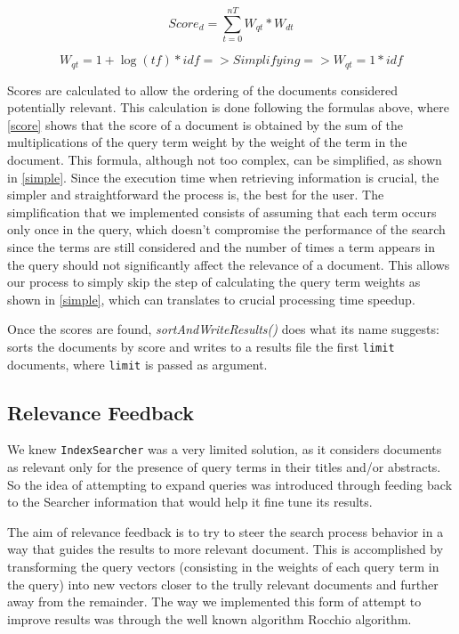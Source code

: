 \documentclass[12pt]{article}
\begin{document}
\begin{equation}
  \label{score}
  Score_{d} = \sum_{t=0}^{nT} W_{qt} * W_{dt}
\end{equation}

\begin{equation}
  \label{simple}
  W_{qt} = 1 + \log(tf) * idf => Simplifying => W_{qt} = 1 * idf
\end{equation}

Scores are calculated to allow the ordering of the documents considered potentially
relevant. This calculation is done following the formulas above, where \ref{score} 
shows that the score of a document is obtained by the sum of the multiplications 
of the query term weight by the weight of the term in the document. 
This formula, although not too complex, can be simplified, as shown in \ref{simple}. 
Since the execution time when retrieving information is crucial, the simpler and 
straightforward the process is, the best for the user. 
The simplification that we implemented consists of assuming that each term occurs 
only once in the query, which doesn't compromise the performance of the search 
since the terms are still considered and the number of times a term appears in 
the query should not significantly affect the relevance of a document. 
This allows our process to simply skip the step of calculating the query term 
weights as shown in \ref{simple}, which can translates to crucial processing time speedup.

Once the scores are found, \textit{sortAndWriteResults()} does what its name 
suggests: sorts the documents by score and writes to a results file the first 
\texttt{limit} documents, where \texttt{limit} is passed as argument.

\subsection{Relevance Feedback}

We knew \texttt{IndexSearcher} was a very limited solution, as it considers 
documents as relevant only for the presence of query terms in their titles 
and/or abstracts.
So the idea of attempting to expand queries was introduced through feeding back
to the Searcher information that would help it fine tune its results.

The aim of relevance feedback is to try to steer the search process behavior 
in a way that guides the results to more relevant document.
This is accomplished by transforming the query vectors (consisting in the weights 
of each query term in the query) into new vectors closer to the trully
relevant documents and further away from the remainder.
The way we implemented this form of attempt to improve results was through the
well known algorithm Rocchio algorithm.
\end{document}
